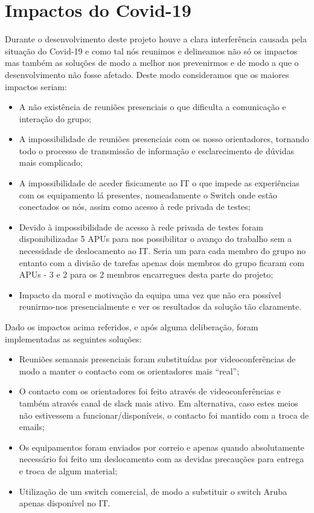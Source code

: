 \section{Impactos do Covid-19}
Durante o desenvolvimento deste projeto houve a clara interferência causada pela situação do Covid-19 e como tal nós reunimos e delineamos não só os impactos mas também as soluções de modo a melhor nos prevenirmos e de modo a que o desenvolvimento não fosse afetado.
Deste modo consideramos que os maiores impactos seriam:
\begin{itemize}
    \item A não existência de reuniões presenciais o que dificulta a comunicação e interação do grupo;
    \item A impossibilidade de reuniões presenciais com os nosso orientadores, tornando todo o processo de transmissão de informação e esclarecimento de dúvidas mais complicado;
    \item A impossibilidade de aceder fisicamente ao IT o que impede as experiências com os equipamento lá presentes, nomeadamente o Switch onde estão conectados os nós, assim como acesso à rede privada de testes;
    \item Devido à impossibilidade de acesso à rede privada de testes foram disponibilizadas 5 APUs para nos possibilitar o avanço do trabalho sem a necessidade de deslocamento ao IT. Seria um para cada membro do grupo no entanto com a divisão de tarefas apenas dois membros do grupo ficaram com APUs - 3 e 2 para os 2 membros encarregues desta parte do projeto;
    \item Impacto da moral e motivação da equipa uma vez que não era possível reunirmo-nos presencialmente e ver os resultados da solução tão claramente.
\end{itemize}

Dado os impactos acima referidos, e após alguma deliberação, foram implementadas as seguintes soluções:
\begin{itemize}
    \item Reuniões semanais presenciais foram substituídas por videoconferências de modo a manter o contacto com os orientadores mais “real”;
    \item O contacto com os orientadores foi feito através de videoconferências e também através canal de slack mais ativo. Em alternativa, caso estes meios não estivessem a funcionar/disponíveis, o contacto foi mantido com a troca de emails;
    \item Os equipamentos foram enviados por correio e apenas quando absolutamente necessário foi feito um deslocamento com as devidas precauções para entrega e troca de algum material;
    \item Utilização de um switch comercial, de modo a substituir o switch Aruba apenas disponível no IT.

\end{itemize}

